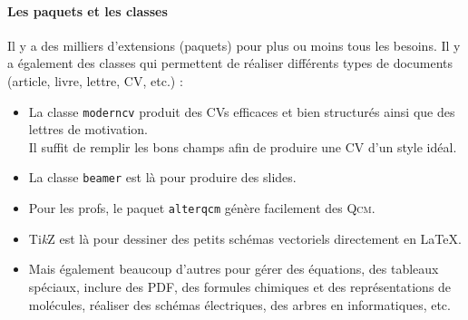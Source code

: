 \paragraph{Les paquets et les classes}
Il y a des milliers d'extensions (paquets) pour plus ou moins tous les besoins. Il y a également des classes qui permettent de réaliser différents types de documents (article, livre, lettre, CV, etc.) :
\begin{itemize}
	\item La classe \texttt{moderncv} produit des CVs efficaces et bien structurés ainsi que des lettres de motivation.\\ Il suffit de remplir les bons champs afin de produire une CV d'un style idéal.
	\item La classe \texttt{beamer} est là pour produire des slides.
	\item Pour les profs, le paquet \texttt{alterqcm} génère facilement des \textsc{Qcm}.
	\item Ti\textit{k}Z est là pour dessiner des petits schémas vectoriels directement en \LaTeX{}.
	\item Mais également beaucoup d'autres pour gérer des équations, des tableaux spéciaux, inclure des PDF, des formules chimiques et des représentations de molécules, réaliser des schémas électriques, des arbres en informatiques, etc.
\end{itemize}


	
